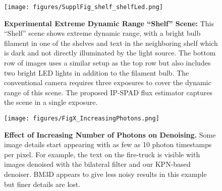 \begin{figure}[!htb]
  \centering
  \texttt{[image: figures/SupplFig\_shelf\_shelfLed.png]}
  \caption{\textbf{Experimental Extreme Dynamic Range ``Shelf'' Scene:}
  This ``Shelf'' scene shows extreme dynamic range, with a bright bulb filament
  in one of the shelves and text in the neighboring shelf which is dark and not
  directly illuminated by the light source. The bottom row of images uses a
  similar setup as the top row but also includes two bright LED lights in
  addition to the filament bulb.  The conventional camera requires three
  exposures to cover the dynamic range of this scene. The proposed IP-SPAD flux
  estimator captures the scene in a single exposure.
    \label{fig:shelf_expt}}
\end{figure}


\clearpage

\begin{figure}[!htb]
  \centering
  \texttt{[image: figures/FigX\_IncreasingPhotons.png]}
	\caption{\textbf{Effect of Increasing Number of Photons on Denoising.}
  Some image details start appearing with as few as 10 photon timestamps per
  pixel. For example, the text on the fire-truck is visible with images
  denoised with the bilateral filter and our KPN-based denoiser.  BM3D appears
  to give less noisy results in this example but finer details are lost.
  \label{fig:passive_first_photon_expt_full}}
\end{figure}


